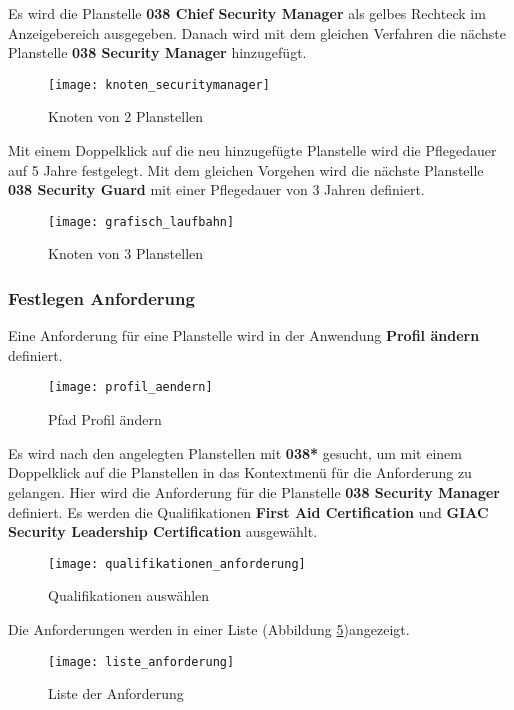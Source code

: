 Es wird die Planstelle \textbf{038 Chief Security Manager} als gelbes Rechteck im Anzeigebereich ausgegeben. Danach wird mit dem gleichen Verfahren die nächste Planstelle \textbf{038 Security Manager} hinzugefügt.
\begin{figure}[H]
	\centering
	\texttt{[image: knoten\_securitymanager]}
	\caption{Knoten von 2 Planstellen}
	\label{fig:knoten_securitymanager}
\end{figure}
Mit einem Doppelklick auf die neu hinzugefügte Planstelle wird die Pflegedauer auf 5 Jahre festgelegt. Mit dem gleichen Vorgehen wird die nächste Planstelle \textbf{038 Security Guard} mit einer Pflegedauer von 3 Jahren definiert.
\begin{figure}[H]
	\centering
	\texttt{[image: grafisch\_laufbahn]}
	\caption{Knoten von 3 Planstellen}
	\label{fig:grafisch_laufbahn}
\end{figure}

\subsubsection{Festlegen Anforderung}
Eine Anforderung für eine Planstelle wird in der Anwendung \textbf{Profil ändern} definiert.
\begin{figure}[H]
	\centering
	\texttt{[image: profil\_aendern]}
	\caption{Pfad Profil ändern}
	\label{fig:profil_aendern}
\end{figure}
Es wird nach den angelegten Planstellen mit \textbf{038*} gesucht, um mit einem Doppelklick auf die Planstellen in das Kontextmenü für die Anforderung zu gelangen. Hier wird die Anforderung für die Planstelle \textbf{038 Security Manager} definiert. Es werden die Qualifikationen \textbf{First Aid Certification} und \textbf{GIAC Security Leadership Certification} ausgewählt.
\begin{figure}[H]
	\centering
	\texttt{[image: qualifikationen\_anforderung]}
	\caption{Qualifikationen auswählen}
	\label{fig:qualifikationen_anforderung}
\end{figure}
Die Anforderungen werden in einer Liste (Abbildung \ref{fig:liste_anforderung})angezeigt.
\begin{figure}[H]
	\centering
	\texttt{[image: liste\_anforderung]}
	\caption{Liste der Anforderung}
	\label{fig:liste_anforderung}
\end{figure}

